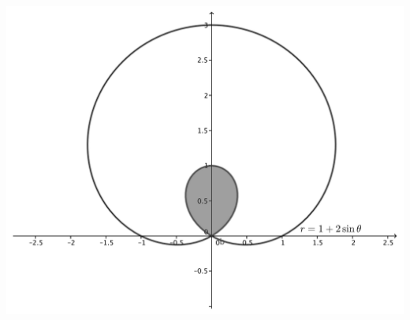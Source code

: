 \documentclass[12pt]{article}
\begin{document}
\begin{enumerate}
\begin{multicols}{2}
 \includegraphics[width=0.9\columnwidth]{WS7-6d}

\end{multicols}


\end{enumerate}
\end{document}
